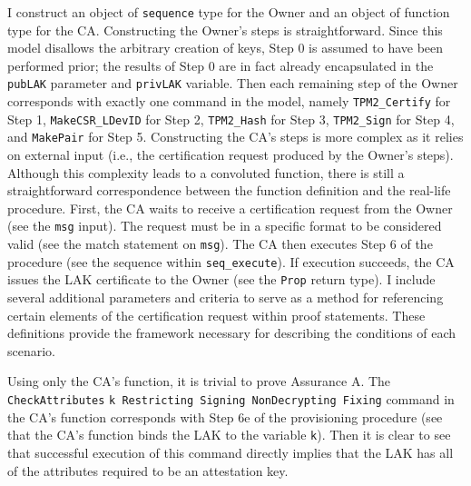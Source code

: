 \documentclass[runningheads]{llncs}
\begin{document}
I construct an object of \verb|sequence| type for the Owner and an object of function type for the CA. Constructing the Owner's steps is straightforward. Since this model disallows the arbitrary creation of keys, Step 0 is assumed to have been performed prior; the results of Step 0 are in fact already encapsulated in the \verb|pubLAK| parameter and \verb|privLAK| variable. Then each remaining step of the Owner corresponds with exactly one command in the model, namely \verb|TPM2_Certify| for Step 1, \verb|MakeCSR_LDevID| for Step 2, \verb|TPM2_Hash| for Step 3, \verb|TPM2_Sign| for Step 4, and \verb|MakePair| for Step 5. 
Constructing the CA's steps is more complex as it relies on external input (i.e., the certification request produced by the Owner's steps). Although this complexity leads to a convoluted function, there is still a straightforward correspondence between the function definition and the real-life procedure. First, the CA waits to receive a certification request from the Owner (see the \verb|msg| input). The request must be in a specific format to be considered valid (see the match statement on \verb|msg|). The CA then executes Step 6 of the procedure (see the sequence within \verb|seq_execute|). If execution succeeds, the CA issues the LAK certificate to the Owner (see the \verb|Prop| return type). I include several additional parameters and criteria to serve as a method for referencing certain elements of the certification request within proof statements. These definitions provide the framework necessary for describing the conditions of each scenario. 


Using only the CA's function, it is trivial to prove Assurance A. The \verb|CheckAttributes| \verb|k Restricting Signing NonDecrypting Fixing| command in the CA's function corresponds with Step 6e of the provisioning procedure 
(see that the CA's function binds the LAK to the variable \verb|k|). Then it is clear to see that successful execution of this command directly implies that the LAK has all of the attributes required to be an attestation key.
\end{document}
